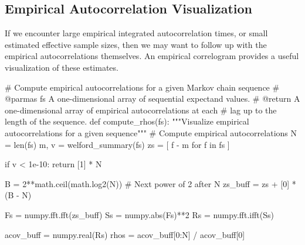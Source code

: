 \documentclass[
  letterpaper,
  DIV=11,
  numbers=noendperiod]{scrartcl}
\newenvironment{Shaded}{\begin{snugshade}}{\end{snugshade}}
\newcommand{\BuiltInTok}[1]{\textcolor[rgb]{0.00,0.23,0.31}{#1}}
\newcommand{\CommentTok}[1]{\textcolor[rgb]{0.37,0.37,0.37}{#1}}
\newcommand{\ControlFlowTok}[1]{\textcolor[rgb]{0.00,0.23,0.31}{#1}}
\newcommand{\DecValTok}[1]{\textcolor[rgb]{0.68,0.00,0.00}{#1}}
\newcommand{\FloatTok}[1]{\textcolor[rgb]{0.68,0.00,0.00}{#1}}
\newcommand{\KeywordTok}[1]{\textcolor[rgb]{0.00,0.23,0.31}{#1}}
\newcommand{\NormalTok}[1]{\textcolor[rgb]{0.00,0.23,0.31}{#1}}
\newcommand{\OperatorTok}[1]{\textcolor[rgb]{0.37,0.37,0.37}{#1}}
\begin{document}
\hypertarget{empirical-autocorrelation-visualization}{%
\subsection{Empirical Autocorrelation
Visualization}\label{empirical-autocorrelation-visualization}}

If we encounter large empirical integrated autocorrelation times, or
small estimated effective sample sizes, then we may want to follow up
with the empirical autocorrelations themselves. An empirical correlogram
provides a useful visualization of these estimates.

\begin{Shaded}
\begin{Highlighting}[]
\CommentTok{\# Compute empirical autocorrelations for a given Markov chain sequence}
\CommentTok{\# @parmas fs A one{-}dimensional array of sequential expectand values.}
\CommentTok{\# @return A one{-}dimensional array of empirical autocorrelations at each }
\CommentTok{\#         lag up to the length of the sequence.}
\KeywordTok{def}\NormalTok{ compute\_rhos(fs):}
  \CommentTok{"""Visualize empirical autocorrelations for a given sequence"""}
  \CommentTok{\# Compute empirical autocorrelations}
\NormalTok{  N }\OperatorTok{=} \BuiltInTok{len}\NormalTok{(fs)}
\NormalTok{  m, v }\OperatorTok{=}\NormalTok{ welford\_summary(fs)}
\NormalTok{  zs }\OperatorTok{=}\NormalTok{ [ f }\OperatorTok{{-}}\NormalTok{ m }\ControlFlowTok{for}\NormalTok{ f }\KeywordTok{in}\NormalTok{ fs ]}
  
  \ControlFlowTok{if}\NormalTok{ v }\OperatorTok{\textless{}} \FloatTok{1e{-}10}\NormalTok{:}
    \ControlFlowTok{return}\NormalTok{ [}\DecValTok{1}\NormalTok{] }\OperatorTok{*}\NormalTok{ N}
  
\NormalTok{  B }\OperatorTok{=} \DecValTok{2}\OperatorTok{**}\NormalTok{math.ceil(math.log2(N)) }\CommentTok{\# Next power of 2 after N}
\NormalTok{  zs\_buff }\OperatorTok{=}\NormalTok{ zs }\OperatorTok{+}\NormalTok{ [}\DecValTok{0}\NormalTok{] }\OperatorTok{*}\NormalTok{ (B }\OperatorTok{{-}}\NormalTok{ N)}
  
\NormalTok{  Fs }\OperatorTok{=}\NormalTok{ numpy.fft.fft(zs\_buff)}
\NormalTok{  Ss }\OperatorTok{=}\NormalTok{ numpy.}\BuiltInTok{abs}\NormalTok{(Fs)}\OperatorTok{**}\DecValTok{2}
\NormalTok{  Rs }\OperatorTok{=}\NormalTok{ numpy.fft.ifft(Ss)}
  
\NormalTok{  acov\_buff }\OperatorTok{=}\NormalTok{ numpy.real(Rs)}
\NormalTok{  rhos }\OperatorTok{=}\NormalTok{ acov\_buff[}\DecValTok{0}\NormalTok{:N] }\OperatorTok{/}\NormalTok{ acov\_buff[}\DecValTok{0}\NormalTok{]}
  

\end{Highlighting}
\end{Shaded}
\end{document}
